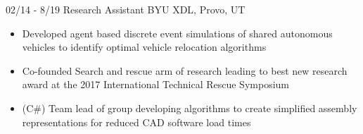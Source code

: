 \documentclass[]{friggeri-cv}
\begin{document}
\begin{entrylist}
  \entry
    {02/14 - 8/19}
    {Research Assistant}
    {BYU XDL, Provo, UT}
    {\vspace{-4mm}
    \begin{itemize}
        \item Developed agent based discrete event simulations of shared autonomous vehicles to identify optimal vehicle relocation algorithms
        \item Co-founded Search and rescue arm of research leading to best new research award at the 2017 International Technical Rescue Symposium
        \item (C\#) Team lead of group developing algorithms to create simplified assembly representations for reduced CAD software load times
    \end{itemize}\vspace{1mm}}


\end{entrylist}
\end{document}
